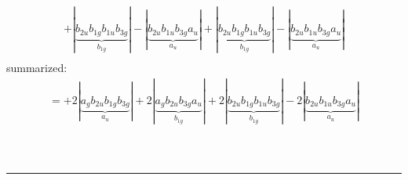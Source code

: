 \documentclass{article}
\begin{document}
\begin{multline*}
+\left|\underbrace{b_{2u} b_{1g} b_{1u} b_{3g}}_{b_{1g}}\right|-\left|\underbrace{b_{2u} b_{1u} b_{3g} a_{u}}_{a_{u}}\right|+\left|\underbrace{b_{2u} b_{1g} b_{1u} b_{3g}}_{b_{1g}}\right|-\left|\underbrace{b_{2u} b_{1u} b_{3g} a_{u}}_{a_{u}}\right|\\
\end{multline*}summarized:\begin{multline*}
=+2\left|\underbrace{a_{g} b_{2u} b_{1g} b_{3g}}_{a_{u}}\right|+2\left|\underbrace{a_{g} b_{2u} b_{3g} a_{u}}_{b_{1g}}\right|+2\left|\underbrace{b_{2u} b_{1g} b_{1u} b_{3g}}_{b_{1g}}\right|-2\left|\underbrace{b_{2u} b_{1u} b_{3g} a_{u}}_{a_{u}}\right|\\
\end{multline*}\\ \\
\hrule\newpage 
\end{document}
